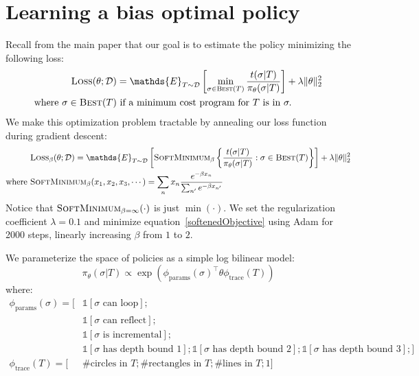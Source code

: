 \documentclass{article}
\newcommand{\indicator}{\mathds{1}} %
\newcommand{\expect}{\mathds{E}} %
\begin{document}
\section{Learning a bias optimal policy}
Recall from the main paper that our goal is to estimate the policy minimizing the following loss:
\begin{align}
\textsc{Loss}(\theta ; \mathcal{D})& =  \expect_{T\sim\mathcal{D}}\left[ \min_{\sigma\in \text{\textsc{Best}}(T)}\frac{t(\sigma | T)}{\pi_\theta (\sigma | T)}\right] + \lambda \Vert\theta\Vert_2^2\label{policyLoss}\\
\text{where }  \sigma \in\text{\textsc{Best}}(T) &\text{ if  a minimum cost program for }T \text{ is in }\sigma .\nonumber %
\end{align}
We make this optimization problem tractable by annealing our loss function during gradient descent:
\begin{align}
&  \textsc{Loss}_\beta(\theta ; \mathcal{D}) =  \expect_{T\sim\mathcal{D}}\left[ \textsc{SoftMinimum}_\beta \left\{
    \frac{t(\sigma | T)}{\pi_\theta (\sigma | T)}    : \sigma\in \text{\textsc{Best}}(T)\right\}\right] + \lambda \Vert\theta\Vert_2^2\label{softenedObjective}\\
  \text{where }&\textsc{SoftMinimum}_\beta (x_1,x_2,x_3,\cdots ) = \sum_n x_n  \frac{e^{-\beta x_n}}{\sum_{n'}e^{-\beta x_{n'}}}
\end{align}
Notice that $\textsc{SoftMinimum}_{\beta = \infty}(\cdot )$ is just $\min(\cdot )$.
We set the regularization coefficient $\lambda = 0.1$ and minimize equation~\ref{softenedObjective}
using Adam for 2000 steps, linearly increasing $\beta$ from $1$ to $2$.

We parameterize the space of policies as a simple log bilinear model:
\begin{equation}
  \pi_{\theta}(\sigma |T)\propto \exp \left( \phi_{\text{params}}(\sigma )^\top\theta \phi_{\text{trace}}(T)\right)
\end{equation}
where:
\begin{align*}
  \phi_{\text{params}}(\sigma ) = [&\indicator [\sigma \text{ can loop}] ;\\
    &\indicator [\sigma \text{ can reflect}];\\
    &\indicator [\sigma \text{ is incremental}] ; \\
    &\indicator [\sigma \text{ has depth bound }1];\indicator [\sigma \text{ has depth bound }2];\indicator [\sigma \text{ has depth bound }3];]\\
  \phi_{\text{trace}}(T) = [&\text{\# circles in }T;\text{\# rectangles in }T;\text{\# lines in }T;1]
  \end{align*}
\end{document}
